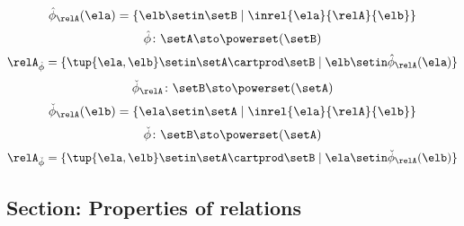 \begin{forslides}
\begin{equation}
        \hat \phi_{\relA} (\ela) = \{ \elb \setin \setB \mid \inrel{\ela}{\relA}{\elb}\}
    \end{equation}
    \begin{equation}\label{eq:slides_session2_rel_120}
        \hat \phi \colon \setA \sto \powerset (\setB)
    \end{equation}
    \begin{equation}\label{eq:slides_session2_rel_121}
        \relA_{\hat \phi} = \{ \tup{\ela, \elb} \setin \setA \cartprod \setB \mid \elb \setin \hat \phi_{\relA}(\ela)  \}
    \end{equation}
    \begin{equation}\label{eq:slides_session2_rel_122}
        \check \phi_{\relA} \colon \setB \sto \powerset (\setA)
    \end{equation}
    \begin{equation}\label{eq:slides_session2_rel_123}
        \check \phi_{\relA} (\elb) = \{ \ela \setin \setA \mid \inrel{\ela}{\relA}{\elb}\}
    \end{equation}
    \begin{equation}\label{eq:slides_session2_rel_124}
        \check \phi \colon \setB \sto \powerset (\setA)
    \end{equation}
    \begin{equation}\label{eq:slides_session2_rel_125}
        \relA_{\check \phi} = \{ \tup{\ela, \elb} \setin \setA \cartprod \setB \mid \ela \setin \check \phi_{\relA}(\elb)\}
    \end{equation}

    \subsection{Section: Properties of relations}


\end{forslides}
